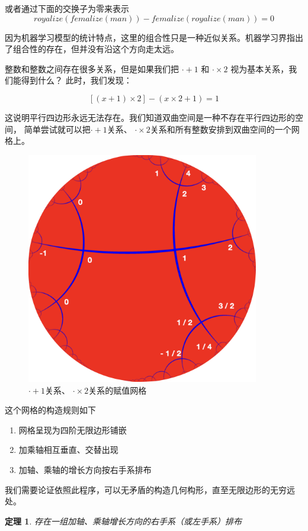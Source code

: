 \documentclass[a4paper,12pt]{article}
\newtheorem{theorem}{定理}
\begin{document}
或者通过下面的交换子为零来表示
$$
    royalize(femalize(man)) - femalize(royalize(man)) = 0
$$

因为机器学习模型的统计特点，这里的组合性只是一种近似关系。机器学习界指出了组合性的存在，但并没有沿这个方向走太远。

整数和整数之间存在很多关系，但是如果我们把 $\cdot + 1$ 和 $\cdot \times 2$ 视为基本关系，我们能得到什么？ 此时，我们发现：

$$
[(x + 1) \times 2] - (x \times 2 + 1) = 1
$$

这说明平行四边形永远无法存在。我们知道双曲空间是一种不存在平行四边形的空间，
简单尝试就可以把$\cdot + 1$关系、 $\cdot \times 2$关系和所有整数安排到双曲空间的一个网格上。

\begin{figure}[ht]
\centering
\includegraphics[width=4in]{images/assignment2.png}
\caption{$\cdot + 1$关系、 $\cdot \times 2$关系的赋值网格}
\end{figure}

这个网格的构造规则如下
\begin{enumerate}
    \item 网格呈现为四阶无限边形铺嵌
    \item 加乘轴相互垂直、交替出现
    \item 加轴、乘轴的增长方向按右手系排布
\end{enumerate}

我们需要论证依照此程序，可以无矛盾的构造几何构形，直至无限边形的无穷远处。

\begin{theorem}
    存在一组加轴、乘轴增长方向的右手系（或左手系）排布
\end{theorem}
\end{document}
